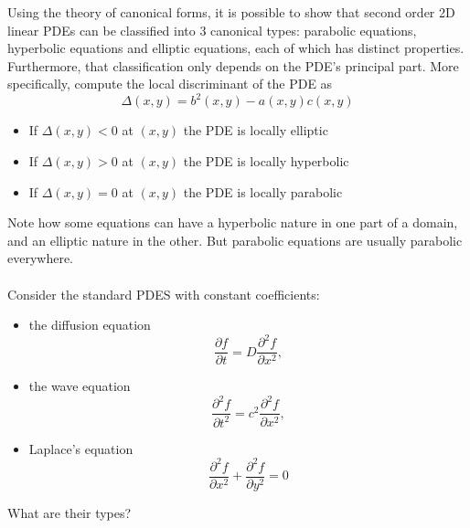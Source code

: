 Using the theory of canonical forms, it is possible to show that second order 2D linear PDEs can be classified into 3 canonical types: parabolic equations, hyperbolic equations and elliptic equations, each of which has distinct properties. Furthermore, that classification only depends on the PDE's principal part. More specifically, compute the local discriminant of the PDE as 
\begin{equation}
    \Delta(x,y) = b^2(x,y) - a(x,y) c(x,y)
\end{equation}
\begin{itemize}
\item If $\Delta(x,y) < 0$ at $(x,y)$ the PDE is locally elliptic
\item If $\Delta(x,y) > 0$ at $(x,y)$ the PDE is locally hyperbolic
\item If $\Delta(x,y) = 0$ at $(x,y)$ the PDE is locally parabolic
\end{itemize}
Note how some equations can have a hyperbolic nature in one part of a domain, and an elliptic nature in the other. But parabolic equations are usually parabolic everywhere.
\\
\\
 Consider the standard PDES with constant coefficients: 
\begin{itemize}
    \item the  diffusion equation 
\begin{equation}
    \frac{\partial f}{\partial t} = D \frac{\partial ^2 f}{\partial x^2},
\end{equation}
\item the wave equation
\begin{equation}
    \frac{\partial^2 f}{\partial t^2} = c^2 \frac{\partial ^2 f}{\partial x^2},
\end{equation}
\item Laplace's equation
\begin{equation}
    \frac{\partial^2 f}{\partial x^2} + \frac{\partial ^2 f}{\partial y^2} = 0 
\end{equation}
\end{itemize}
What are their types?
\\
\\
